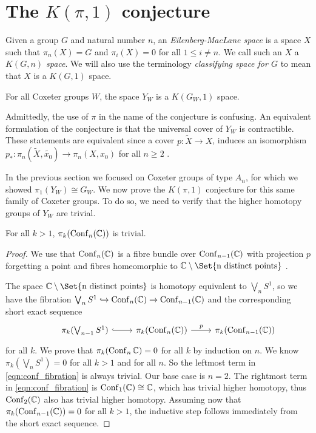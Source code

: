 \documentclass[class=article, crop=false]{standalone}
\begin{document}
	
\section{The \texorpdfstring{$K(\pi,1)$}{K pi 1} conjecture}
Given a group $G$ and natural number $n$, an \emph{Eilenberg-MacLane space} \cite{eilenberg_maclane_relations_1945} is a space $X$ such that $\pi_n(X)=G$ and $\pi_i(X) = 0$ for all $1\leq i \neq n$. We call such an $X$ a \emph{$K(G,n)$ space}. We will also use the terminology \emph{classifying space for $G$} to mean that $X$ is a $K(G,1)$ space.
\begin{conjecture}[$K(\pi,1)$ Conjecture]
	For all Coxeter groups $W$, the space $Y_W$ is a $K(G_W,1)$ space.
\end{conjecture}

Admittedly, the use of $\pi$ in the name of the conjecture is confusing. An equivalent formulation of the conjecture is that the universal cover of $Y_W$ is contractible. These statements are equivalent since a cover $p \colon \tilde{X} \to X$, induces an isomorphism  $p_* \colon \pi_n(\tilde{X},\tilde{x_0}) \to \pi_n(X,x_0)$ for all $n\geq 2$ \cite[Proposition 4.1]{hatcher_algebraic_2001}.

In the previous section we focused on Coxeter groups of type $A_n$, for which we showed $\pi_1(Y_W) \cong G_W$. We now prove the $K(\pi,1)$ conjecture for this same family of Coxeter groups. To do so, we need to verify that the higher homotopy groups of $Y_W$ are trivial.

\begin{lemma}
	For all $k>1$, $\pi_k(\operatorname{Conf}_n(\mathbb{C}))$ is trivial.
	\label{lem:labelled_conf_classiftying_space}
\end{lemma}
\begin{proof}
	We use that $\operatorname{Conf}_n(\mathbb{C})$ is a fibre bundle over $\operatorname{Conf}_{n-1}(\mathbb{C})$ with projection $p$ forgetting a point and fibres homeomorphic to $\C \setminus \Set{\text{n distinct points}}$ \cite[Theorem 3]{fadell_neuwirth_configuration_1962}.

The space $\C \setminus \Set{\text{n distinct points}}$ is homotopy equivalent to $\bigvee_n S^1$, so we have the fibration $\bigvee_n S^1 \hookrightarrow \operatorname{Conf}_n(\mathbb{C}) \to \operatorname{Conf}_{n-1}(\mathbb{C})$ and the corresponding short exact sequence
\begin{equation}
	\begin{tikzcd}
		&\pi_k(\bigvee_{n-1} S^1) \arrow[hook]{r} &\pi_k(\conf_n(\C)) \arrow{r}{p} &\pi_k(\conf_{n-1}(\C))
	\end{tikzcd}
	\label{eqn:conf_fibration}
\end{equation}
for all $k$.
We prove that $\pi_k(\operatorname{Conf}_n{\mathbb{C}})=0$ for all $k$ by induction on $n$. We know $\pi_k(\bigvee_nS^1)=0$ for all $k>1$ and for all $n$. So the leftmost term in \eqref{eqn:conf_fibration} is always trivial. Our base case is $n=2$. The rightmost term in \eqref{eqn:conf_fibration} is $\operatorname{Conf}_1(\mathbb{C}) \cong \mathbb{C}$, which has trivial higher homotopy, thus $\operatorname{Conf}_2(\mathbb{C})$ also has trivial higher homotopy. Assuming now that $\pi_k(\operatorname{Conf}_{n-1}(\mathbb{C})) = 0$ for all $k>1$, the inductive step follows immediately from the short exact sequence.
\end{proof}
\end{document}

